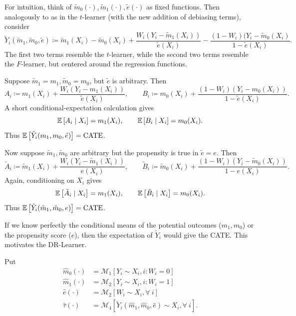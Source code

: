 \begin{remark}	For intuition,
	think of $\tilde{m}_0(\cdot ), \tilde{m}_1(\cdot ), \tilde{e}(\cdot )$ as fixed functions. Then analogously to as in the $t$-learner (with the new addition of debiasing terms), consider \[
		\tilde{Y}_i(\tilde{m}_1, \tilde{m}_0, \tilde{e}) \coloneqq \tilde{m}_1\left( X_i \right) - \tilde{m}_0(X_i) + \frac{W_i \left( Y_i - \tilde{m}_1(X_i) \right)}{\tilde{e}(X_i)} - \frac{(1-W_i)(Y_i  - \tilde{m}_0(X_i)}{1-\tilde{e}(X_i)}
	.\] 
	The first two terms resemble the $t$-learner, while the second two terms resemble the $F$-learner, but centered around the regression functions.

	Suppose $\tilde{m}_1 = m_1, \tilde{m}_0 = m_0$, but $\tilde{e}$ is arbitrary. Then
		\[
			A_i \coloneqq m_1(X_i) + \frac{W_i (Y_i - m_1(X_i))}{\tilde{e}(X_i)},
			\qquad
			B_i \coloneqq m_0(X_i) + \frac{(1-W_i)(Y_i - m_0(X_i))}{1- \tilde{e}(X_i)}.
		\]
		A short conditional-expectation calculation gives
		\[
			\mathbb{E}\left[A_i \mid X_i\right] = m_1(X_i),
			\qquad
			\mathbb{E}\left[B_i \mid X_i\right] = m_0(X_i).
		\]
		Thus $\mathbb{E}\left[\tilde{Y}_i(m_1,m_0,\tilde{e})\right] = \operatorname{CATE}$.

	Now suppose $\tilde{m}_1, \tilde{m}_0$ are arbitrary but the propensity is true in $\tilde{e}= e$.
	Then 
		\[
			\tilde{A}_i \coloneqq \tilde{m}_1(X_i) + \frac{W_i (Y_i - \tilde{m}_1(X_i))}{e(X_i)},
			\qquad
			\tilde{B}_i \coloneqq \tilde{m}_0(X_i) + \frac{(1-W_i)(Y_i - \tilde{m}_0(X_i))}{1- e(X_i)}.
		\]
		Again, conditioning on $X_i$ gives
		\[
			\mathbb{E}\left[\tilde{A}_i \mid X_i\right] = m_1(X_i),
			\qquad
			\mathbb{E}\left[\tilde{B}_i \mid X_i\right] = m_0(X_i).
		\]
		Thus $\mathbb{E}\left[\tilde{Y}_i (\tilde{m}_1, \tilde{m}_0, e)\right] = \operatorname{CATE}$.
\end{remark}

If we know perfectly the conditional means of the potential outcomes ($m_1,m_0$) or the propensity score ($e$), then the expectation of $\tilde{Y}_i$ would give the CATE. This motivates the DR-Learner.

\begin{definition}[DR-Learner]
	Put 
	\begin{align*}
		\hat{m}_0(\cdot ) &= \mathscr{M}_1 \left[ Y_i \sim X_i, i: W_i =0 \right] \\
		\hat{m}_1(\cdot ) &= \mathscr{M}_2 \left[ Y_i \sim X_i, i: W_i =1 \right] \\
		\hat{e}(\cdot ) &= \mathscr{M}_2\left[ W_i \sim X_i, \forall\ i \right]\\
		\hat{\tau}(\cdot ) &= \mathscr{M}_4 \left[ \tilde{Y}_i \left( \hat{m}_1, \hat{m}_0 , \hat{e} \right) \sim X_i, \forall\ i \right]
	.\end{align*}
\end{definition}

